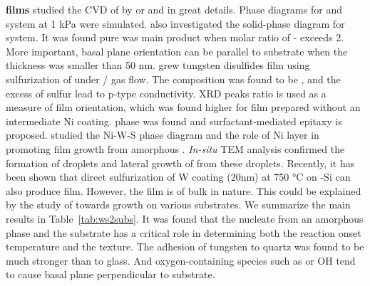 \textbf{ films} \citeauthor{Lee1994} studied the CVD of  by  or  and  in great details. Phase diagrams for  and  system at 1 kPa were simulated. \citeauthor{Endler1999} also investigated the solid-phase diagram for  system.\cite{Endler1999} It was found pure  was main product when molar ratio of - exceeds 2. More important,  basal plane orientation can be parallel to substrate when the thickness was smaller than 50 nm. \cite{Ennaoui1995a} grew tungsten disulfides film using sulfurization of  under / gas flow. The composition was found to be , and the excess of sulfur lead to p-type conductivity. XRD peaks ratio is used as a measure of film orientation, which was found higher for film prepared without an intermediate Ni coating.  phase was found and surfactant-mediated epitaxy is proposed. \citeauthor{Regula1997} studied the Ni-W-S phase diagram and the role of Ni layer in promoting  film growth from amorphous .\cite{Regula1997} \emph{In-situ} TEM analysis confirmed the formation of  droplets and lateral growth of  from these droplets.\cite{Regula1998} Recently, it has been shown that direct sulfurization of W coating (20nm) at 750 \si{\degreeCelsius} on -Si can also produce  film.\cite{Shanmugam2012a} However, the film is of bulk in nature. This could be explained by the study of \citeauthor{Genut1992} towards  growth on various substrates.\cite{Genut1992} We summarize the main results in Table~\ref{tab:ws2subs}. It was found that the  nucleate from an amorphous  phase and the substrate has a critical role in determining both the reaction onset temperature and the texture. The adhesion of tungsten to quartz was found to be much stronger than to glass. And oxygen-containing species such as  or OH tend to cause  basal plane perpendicular to substrate.
